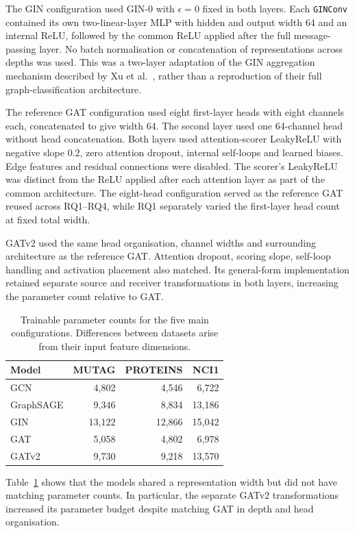 \documentclass[11pt,a4paper]{article}
\begin{document}
The GIN configuration used GIN-0 with \(\epsilon=0\) fixed in both layers. Each \texttt{GINConv} contained its own two-linear-layer MLP with hidden and output width 64 and an internal ReLU, followed by the common ReLU applied after the full message-passing layer. No batch normalisation or concatenation of representations across depths was used. This was a two-layer adaptation of the GIN aggregation mechanism described by Xu et al.~\cite{xu2019powerful}, rather than a reproduction of their full graph-classification architecture.

The reference GAT configuration used eight first-layer heads with eight channels each, concatenated to give width 64. The second layer used one 64-channel head without head concatenation. Both layers used attention-scorer LeakyReLU with negative slope 0.2, zero attention dropout, internal self-loops and learned biases. Edge features and residual connections were disabled. The scorer's LeakyReLU was distinct from the ReLU applied after each attention layer as part of the common architecture. The eight-head configuration served as the reference GAT reused across RQ1--RQ4, while RQ1 separately varied the first-layer head count at fixed total width.

GATv2 used the same head organisation, channel widths and surrounding architecture as the reference GAT. Attention dropout, scoring slope, self-loop handling and activation placement also matched. Its general-form implementation retained separate source and receiver transformations in both layers, increasing the parameter count relative to GAT.

\begin{table}[!ht]
\centering
\caption{Trainable parameter counts for the five main configurations. Differences between datasets arise from their input feature dimensions.}
\label{tab:parameters}
\begin{tabular}{@{}lrrr@{}}
\toprule
Model & MUTAG & PROTEINS & NCI1\\
\midrule
GCN & 4,802 & 4,546 & 6,722\\
GraphSAGE & 9,346 & 8,834 & 13,186\\
GIN & 13,122 & 12,866 & 15,042\\
GAT & 5,058 & 4,802 & 6,978\\
GATv2 & 9,730 & 9,218 & 13,570\\
\bottomrule
\end{tabular}
\end{table}

Table~\ref{tab:parameters} shows that the models shared a representation width but did not have matching parameter counts. In particular, the separate GATv2 transformations increased its parameter budget despite matching GAT in depth and head organisation.
\end{document}
